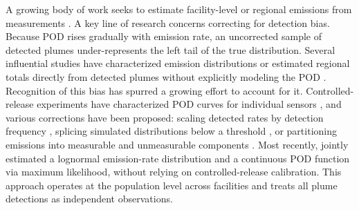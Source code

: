 \documentclass[numsec,webpdf,modern,mediumone]{oup-authoring-template}
\begin{document}

A growing body of work seeks to estimate facility-level or regional emissions from measurements \citep{Sherwin2024Nature, Jervis2025Science, Johnson2023CommEE, Cusworth2021}. A key line of research concerns correcting for detection bias. Because POD rises gradually with emission rate, an uncorrected sample of detected plumes under-represents the left tail of the true distribution. Several influential studies have characterized emission distributions or estimated regional totals directly from detected plumes without explicitly modeling the POD \citep{Lauvaux2022, Ehret2022, Frankenberg2016}. Recognition of this bias has spurred a growing effort to account for it. Controlled-release experiments have characterized POD curves for individual sensors \citep{Sherwin2021, Bell2022, Conrad2023, ElAbbadi2024, GHGSatMATM2025}, and various corrections have been proposed: scaling detected rates by detection frequency \citep{Jervis2025Science}, splicing simulated distributions below a threshold \citep{Sherwin2024Nature}, or partitioning emissions into measurable and unmeasurable components \citep{Johnson2023CommEE}. Most recently, \citet{JervisPreprint2025} jointly estimated a lognormal emission-rate distribution and a continuous POD function via maximum likelihood, without relying on controlled-release calibration. This approach operates at the population level across facilities and treats all plume detections as independent observations.
\end{document}
